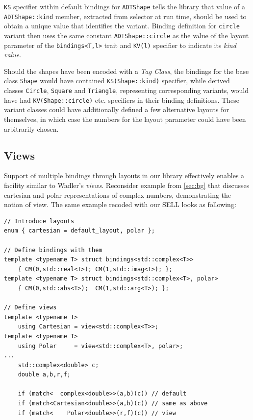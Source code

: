 \documentclass[preprint]{sigplanconf}
\makeatletter
\DeclareRobustCommand{\code}[1]{{\lstinline[breaklines=false,escapechar=@]{#1}}}
\makeatother
\begin{document}
\noindent
\code{KS} specifier within default bindings for \code{ADTShape} tells the library 
that value of a \code{ADTShape::kind} member, extracted from selector at run time, 
should be used to obtain a unique value that identifies the variant. Binding 
definition for \code{circle} variant then uses the same constant 
\code{ADTShape::circle} as the value of the layout parameter of the 
\code{bindings<T,l>} trait and \code{KV(l)} specifier to indicate its \emph{kind 
value}.

Should the shapes have been encoded with a \emph{Tag Class}, the bindings for 
the base class \code{Shape} would have contained \code{KS(Shape::kind)} 
specifier, while derived classes \code{Circle}, \code{Square} and 
\code{Triangle}, representing corresponding variants, would have had 
\code{KV(Shape::circle)} etc. specifiers in their binding definitions. These 
variant classes could have additionally defined a few alternative layouts for 
themselves, in which case the numbers for the layout parameter could have been 
arbitrarily chosen.

\subsection{Views}
\label{sec:view}

Support of multiple bindings through layouts in our library effectively enables 
a facility similar to Wadler's \emph{views}. Reconsider example from 
\textsection\ref{sec:bg} that discusses cartesian and polar representations of 
complex numbers, demonstrating the notion of view. The same example recoded with 
our SELL looks as following:

\begin{lstlisting}
// Introduce layouts
enum { cartesian = default_layout, polar };

// Define bindings with them
template <typename T> struct bindings<std::complex<T>>
    { CM(0,std::real<T>); CM(1,std::imag<T>); };
template <typename T> struct bindings<std::complex<T>, polar>
    { CM(0,std::abs<T>);  CM(1,std::arg<T>); };

// Define views
template <typename T> 
    using Cartesian = view<std::complex<T>>;
template <typename T> 
    using Polar     = view<std::complex<T>, polar>;
...
    std::complex<double> c;
    double a,b,r,f;

    if (match<  complex<double>>(a,b)(c)) // default
    if (match<Cartesian<double>>(a,b)(c)) // same as above
    if (match<    Polar<double>>(r,f)(c)) // view
\end{lstlisting}
\end{document}
